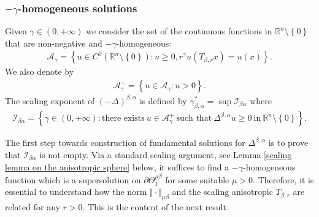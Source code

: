 \documentclass[10pt, leqno]{article}
\theoremstyle{definition}
\theoremstyle{remark}
\numberwithin{equation}{section}
\begin{document}
\subsubsection{$-\gamma$-homogeneous solutions}
Given $\gamma \in \left(0, +\infty \right)$ we consider the set of the continuous functions in $\mathbb{R}^{n}\setminus \left\lbrace 0 \right\rbrace$ that are non-negative and $-\gamma$-homogeneous:
\begin{eqnarray}
\mathcal{A}_{\gamma} = \left\lbrace u \in C^{0}_{}\left(\mathbb{R}^{n}\setminus \left\lbrace 0 \right\rbrace \right): u \geq 0, r^{\gamma} u(T_{\beta, r} x) = u(x) \right\rbrace.
\end{eqnarray}
We also denote by
\begin{eqnarray}
\mathcal{A}^{+}_{\gamma} = \left\lbrace u \in \mathcal{A}_{\gamma}: u > 0 \right\rbrace.
\end{eqnarray}
The scaling exponent of $(-\Delta)^{\beta, \alpha}$ is defined by $\gamma_{\beta, \alpha}^{\ast} = \sup \mathcal{I}_{\beta\alpha}$ where
\begin{eqnarray*}
\mathcal{I}_{\beta\alpha} = \left\lbrace \gamma \in \left(0, +\infty \right) : \text{there exists} \ u \in \mathcal{A}^{+}_{\gamma} \ \text{such that} \ \Delta^{\beta, \alpha}u \geq 0 \ \text{in} \ \mathbb{R}^{n}\setminus \left\lbrace 0 \right\rbrace  \right\rbrace.
\end{eqnarray*}

The first step towards construction of fundamental solutions for $\Delta^{\beta, \alpha}$ is to prove that $\mathcal{I}_{\beta\alpha}$ is not empty. Via a standard scaling argument, see Lemma \ref{scaling lemma on the anisotropic sphere} below, it suffices to find a $-\gamma$-homogeneous function which is a supersolution on $\partial \Theta^{\mu \beta}_{1}$ for some suitable $\mu>0$. Therefore, it is essential to understand how the norm $\Vert \cdot \Vert_{\mu \beta}$ and the scaling anisotropic $T_{\beta, r}$ are related for any $r>0$. This is the content of the next result.
\end{document}
